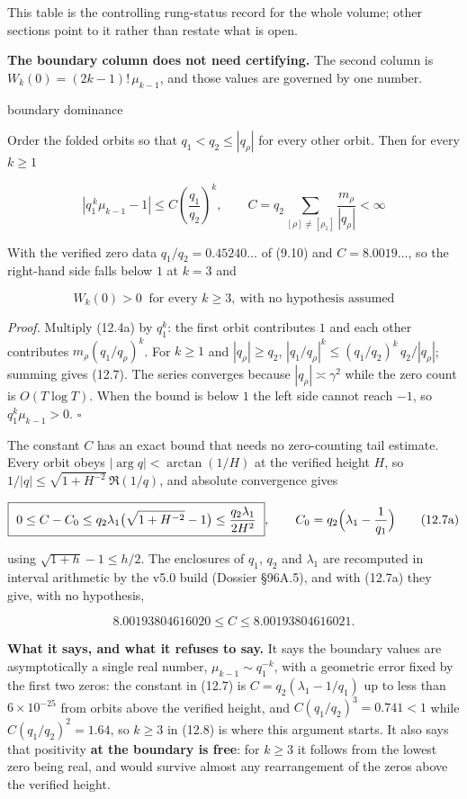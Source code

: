 \documentclass[
  11pt,
]{book}
\begin{document}
This table is the controlling rung-status record for the whole volume;
other sections point to it rather than restate what is open.

\textbf{The boundary column does not need certifying.} The second column
is \(W_k(0)=(2k-1)!\,\mu_{k-1}\), and those values are governed by one
number.

\begin{tnclosed}{boundary dominance}

Order the folded orbits so that \(q_1<q_2\le|q_\rho|\) for every other
orbit. Then for every \(k\ge1\)

\[
\left|q_1^{\,k}\mu_{k-1}-1\right|\le C\left(\frac{q_1}{q_2}\right)^{\!k},
\qquad
C=q_2\!\!\sum_{[\rho]\neq[\rho_1]}\frac{m_\rho}{|q_\rho|}<\infty
\tag{12.7}
\]

With the verified zero data \(q_1/q_2=0.45240\ldots\) of (9.10) and
\(C=8.0019\ldots\), so the right-hand side falls below \(1\) at \(k=3\)
and

\[
\boxed{W_k(0)>0\ \text{ for every }k\ge3,\ \text{with no hypothesis assumed}}
\tag{12.8}
\]

\end{tnclosed}

\emph{Proof.} Multiply (12.4a) by \(q_1^{k}\): the first orbit
contributes \(1\) and each other contributes \(m_\rho(q_1/q_\rho)^k\).
For \(k\ge1\) and \(|q_\rho|\ge q_2\),
\(|q_1/q_\rho|^{k}\le(q_1/q_2)^{k}\,q_2/|q_\rho|\); summing gives
(12.7). The series converges because \(|q_\rho|\asymp\gamma^2\) while
the zero count is \(O(T\log T)\). When the bound is below \(1\) the left
side cannot reach \(-1\), so \(q_1^{k}\mu_{k-1}>0\). \(\square\)

The constant \(C\) has an exact bound that needs no zero-counting tail
estimate. Every orbit obeys \(|\arg q|<\arctan(1/H)\) at the verified
height \(H\), so \(1/|q|\le\sqrt{1+H^{-2}}\,\Re(1/q)\), and absolute
convergence gives

\[
\boxed{\ 0\le C-C_0\le q_2\lambda_1\bigl(\sqrt{1+H^{-2}}-1\bigr)\le\frac{q_2\lambda_1}{2H^2}\ },
\qquad C_0=q_2\Bigl(\lambda_1-\frac1{q_1}\Bigr)
\tag{12.7a}
\]

using \(\sqrt{1+h}-1\le h/2\). The enclosures of \(q_1\), \(q_2\) and
\(\lambda_1\) are recomputed in interval arithmetic by the v5.0 build
(Dossier §96A.5), and with (12.7a) they give, with no hypothesis,

\[
8.00193804616020\le C\le8.00193804616021.
\]

\textbf{What it says, and what it refuses to say.} It says the boundary
values are asymptotically a single real number,
\(\mu_{k-1}\sim q_1^{-k}\), with a geometric error fixed by the first
two zeros: the constant in (12.7) is \(C=q_2(\lambda_1-1/q_1)\) up to
less than \(6\times10^{-25}\) from orbits above the verified height, and
\(C(q_1/q_2)^3=0.741<1\) while \(C(q_1/q_2)^2=1.64\), so \(k\ge3\) in
(12.8) is where this argument starts. It also says that positivity
\textbf{at the boundary is free}: for \(k\ge3\) it follows from the
lowest zero being real, and would survive almost any rearrangement of
the zeros above the verified height.
\end{document}
